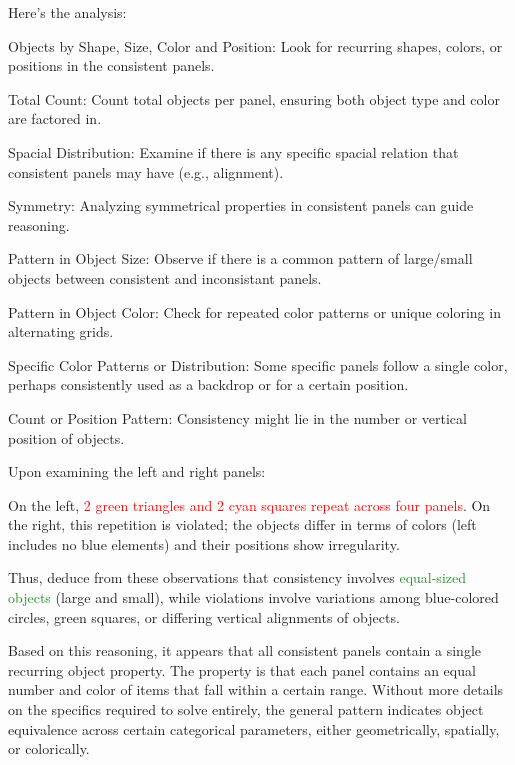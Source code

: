 \begin{tcolorbox}[breakable,enhanced jigsaw,opacityback=0,]
\begin{dialogue}
		Here's the analysis:
		
		Objects by Shape, Size, Color and Position: Look for recurring shapes, colors, or positions in the consistent panels.
		
		Total Count: Count total objects per panel, ensuring both object type and color are factored in.
		
		Spacial Distribution: Examine if there is any specific spacial relation that consistent panels may have (e.g., alignment).
		
		Symmetry: Analyzing symmetrical properties in consistent panels can guide reasoning.
		
		Pattern in Object Size: Observe if there is a common pattern of large/small objects between consistent and inconsistant panels.
		
		Pattern in Object Color: Check for repeated color patterns or unique coloring in alternating grids.
		
		Specific Color Patterns or Distribution: Some specific panels follow a single color, perhaps consistently used as a backdrop or for a certain position.
		
		Count or Position Pattern: Consistency might lie in the number or vertical position of objects.
		
		Upon examining the left and right panels:
		
		On the left, \textcolor{red}{2 green triangles and 2 cyan squares repeat across four panels}.
		On the right, this repetition is violated; the objects differ in terms of colors (left includes no blue elements) and their positions show irregularity.
		
		Thus, deduce from these observations that consistency involves \textcolor{ForestGreen}{equal-sized objects} (large and small), while violations involve variations among blue-colored circles, green squares, or differing vertical alignments of objects.
		
		Based on this reasoning, it appears that all consistent panels contain a single recurring object property. The property is that each panel contains an equal number and color of items that fall within a certain range. Without more details on the specifics required to solve entirely, the general pattern indicates object equivalence across certain categorical parameters, either geometrically, spatially, or colorically.
	\end{dialogue}
	\label{fig:task16-bongard}
\end{tcolorbox}




